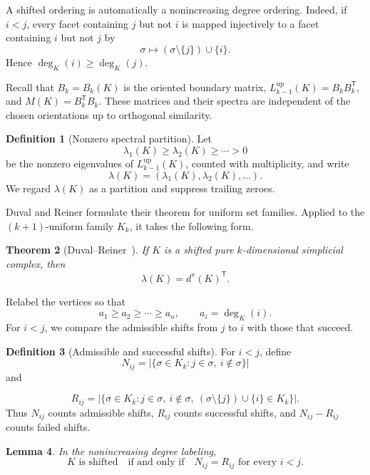 \documentclass[11pt,reqno]{amsart}
\numberwithin{equation}{section}
\theoremstyle{plain}
\newtheorem{theorem}{Theorem}[section]
\newtheorem{lemma}[theorem]{Lemma}
\theoremstyle{definition}
\newtheorem{definition}[theorem]{Definition}
\newcommand{\Lup}{L^{\mathrm{up}}}
\newcommand{\T}{\mathsf{T}}
\begin{document}
A shifted ordering is automatically a nonincreasing degree ordering. Indeed, if $i<j$, every
facet containing $j$ but not $i$ is mapped injectively to a facet containing $i$ but not $j$ by
\[
  \sigma\longmapsto(\sigma\setminus\{j\})\cup\{i\}.
\]
Hence $\deg_K(i)\ge\deg_K(j)$.

Recall that $B_k=B_k(K)$ is the oriented boundary matrix,
$\Lup_{k-1}(K)=B_kB_k^{\T}$, and $M(K)=B_k^{\T}B_k$. These matrices and their spectra are
independent of the chosen orientations up to orthogonal similarity.

\begin{definition}[Nonzero spectral partition]\label{def:spectrum}
Let
\[
  \lambda_1(K)\ge\lambda_2(K)\ge\cdots>0
\]
be the nonzero eigenvalues of $\Lup_{k-1}(K)$, counted with multiplicity, and write
\[
  \lambda(K)=(\lambda_1(K),\lambda_2(K),\ldots).
\]
We regard $\lambda(K)$ as a partition and suppress trailing zeroes.
\end{definition}




Duval and Reiner formulate their theorem for uniform set families. Applied to the
$(k+1)$-uniform family $K_k$, it takes the following form.

\begin{theorem}[Duval--Reiner~\cite{DuvalReiner}]\label{thm:DR}
If $K$ is a shifted pure $k$-dimensional simplicial complex, then
\[
  \lambda(K)={d^{\mathrm v}(K)}^{\T}.
\]
\end{theorem}





Relabel the vertices so that
\[
  a_1\ge a_2\ge\cdots\ge a_n,
  \qquad a_i=\deg_K(i).
\]
For $i<j$, we compare the admissible shifts from $j$ to $i$ with those that succeed.

\begin{definition}[Admissible and successful shifts]\label{def:NR}
For $i<j$, define
\[
  N_{ij}=\bigl|\{\sigma\in K_k:j\in\sigma,\ i\notin\sigma\}\bigr|
\]
and

\[
  R_{ij}=\bigl|\{\sigma\in K_k:j\in\sigma,\ i\notin\sigma,
  \ (\sigma\setminus\{j\})\cup\{i\}\in K_k\}\bigr|.
\]
Thus $N_{ij}$ counts admissible shifts, $R_{ij}$ counts successful shifts, and
$N_{ij}-R_{ij}$ counts failed shifts.
\end{definition}

\begin{lemma}\label{lem:NRshifted}
In the nonincreasing degree labeling,
\[
  K\text{ is shifted}
  \quad\text{if and only if}\quad
  N_{ij}=R_{ij}\text{ for every }i<j.
\]
\end{lemma}
\end{document}
